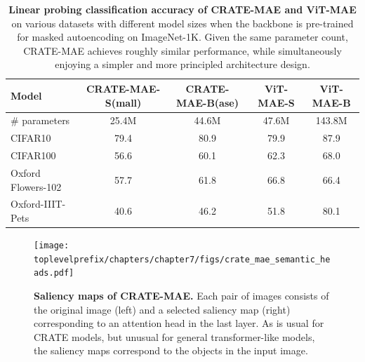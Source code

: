 \documentclass[../../book-main.tex]{subfiles}
\begin{document}
\begin{table}
    \centering 
    \begin{tabular}{@{}lcc|cc@{}}
        \toprule 
        \textbf{Model} & CRATE-MAE-S(mall) & CRATE-MAE-B(ase) & {\color{gray} ViT-MAE-S} & {\color{gray} ViT-MAE-B} \\
        \midrule
        \midrule
        \# parameters & 25.4M & 44.6M & 47.6M & {\color{gray}143.8M} \\
        \midrule
        CIFAR10 & 79.4 & 80.9 & {\color{gray} 79.9} & {\color{gray} 87.9} \\
        CIFAR100 & 56.6 & 60.1 & {\color{gray} 62.3} & {\color{gray} 68.0} \\
        Oxford Flowers-102 & 57.7 & 61.8 & {\color{gray} 66.8} & {\color{gray} 66.4} \\
        Oxford-IIIT-Pets & 40.6 & 46.2 & {\color{gray} 51.8} & {\color{gray} 80.1} \\
        \bottomrule
    \end{tabular}
    \caption{\small\textbf{Linear probing classification accuracy of CRATE-MAE and ViT-MAE} on various datasets with different model sizes when the backbone is pre-trained for masked autoencoding on ImageNet-1K. Given the same parameter count, CRATE-MAE achieves roughly similar performance, while simultaneously enjoying a simpler and more principled architecture design.}
    \label{tab:crate_mae_linear_probing}
\end{table}

\begin{figure}
    \centering 
    \texttt{[image: \\toplevelprefix/chapters/chapter7/figs/crate\_mae\_semantic\_heads.pdf]}
    \caption{\small\textbf{Saliency maps of CRATE-MAE.} Each pair of images consists of the original image (left) and a selected saliency map (right) corresponding to an attention head in the last layer. As is usual for CRATE models, but unusual for general transformer-like models, the saliency maps correspond to the objects in the input image.}
    \label{fig:crate_mae_semantic_heads}
\end{figure}


\end{document}
